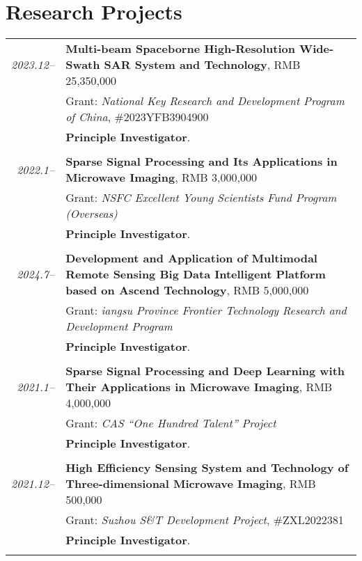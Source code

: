 \documentclass[paper=a4,fontsize=11pt]{scrartcl}
\begin{document}
\section*{Research Projects}

\begin{longtable}{r|p{12cm}}
	
	\emph{2023.12--} & \textbf{Multi-beam Spaceborne High-Resolution Wide-Swath SAR System and Technology}, RMB 25,350,000 \\
	& Grant: \emph{National Key Research and Development Program of China}, \#2023YFB3904900\\
	& \textbf{Principle Investigator}.\\
	\multicolumn{2}{c}{} \\
	
	\emph{2022.1--} & \textbf{Sparse Signal Processing and Its Applications in Microwave Imaging}, RMB 3,000,000 \\
	& Grant: \emph{NSFC Excellent Young Scientists Fund Program (Overseas)}\\
	& \textbf{Principle Investigator}.\\
	\multicolumn{2}{c}{} \\
	
	\emph{2024.7--} & \textbf{Development and Application of Multimodal Remote Sensing Big Data Intelligent Platform based on Ascend Technology}, RMB 5,000,000 \\
	& Grant: \emph{iangsu Province Frontier Technology Research and Development Program}\\
	& \textbf{Principle Investigator}.\\
	\multicolumn{2}{c}{} \\
	
	\emph{2021.1--} & \textbf{Sparse Signal Processing and Deep Learning with Their Applications in Microwave Imaging}, RMB 4,000,000 \\
	& Grant: \emph{CAS ``One Hundred Talent'' Project}\\
	& \textbf{Principle Investigator}.\\
	\multicolumn{2}{c}{} \\
	
	\emph{2021.12--} & \textbf{High Efficiency Sensing System and Technology of Three-dimensional Microwave Imaging}, RMB 500,000 \\
	& Grant: \emph{Suzhou S\&T Development Project}, \#ZXL2022381\\
	& \textbf{Principle Investigator}.\\
	\multicolumn{2}{c}{} \\
	

\end{longtable}
\end{document}
